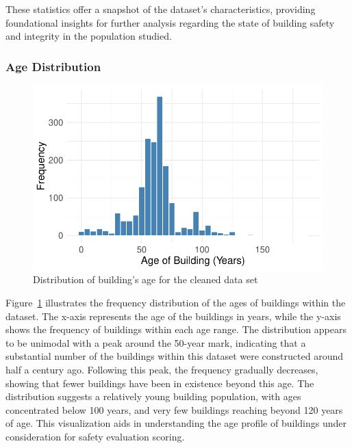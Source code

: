 \documentclass[
  letterpaper,
  DIV=11,
  numbers=noendperiod]{scrartcl}
\begin{document}
These statistics offer a snapshot of the dataset's characteristics,
providing foundational insights for further analysis regarding the state
of building safety and integrity in the population studied.

\hypertarget{age-distribution}{%
\subsubsection{Age Distribution}\label{age-distribution}}

\begin{figure}

{\centering \includegraphics{paper_files/figure-pdf/fig-age-distribution-1.pdf}

}

\caption{\label{fig-age-distribution}Distribution of building's age for
the cleaned data set}

\end{figure}

Figure~\ref{fig-age-distribution} illustrates the frequency distribution
of the ages of buildings within the dataset. The x-axis represents the
age of the buildings in years, while the y-axis shows the frequency of
buildings within each age range. The distribution appears to be unimodal
with a peak around the 50-year mark, indicating that a substantial
number of the buildings within this dataset were constructed around half
a century ago. Following this peak, the frequency gradually decreases,
showing that fewer buildings have been in existence beyond this age. The
distribution suggests a relatively young building population, with ages
concentrated below 100 years, and very few buildings reaching beyond 120
years of age. This visualization aids in understanding the age profile
of buildings under consideration for safety evaluation scoring.
\end{document}
